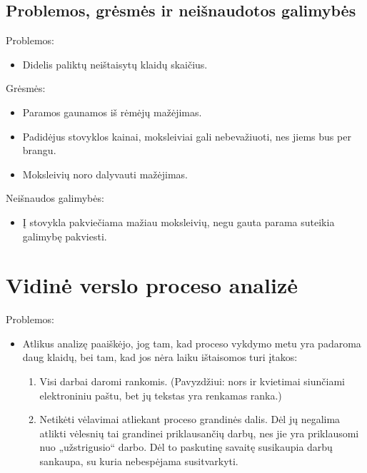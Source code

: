\subsection{Problemos, grėsmės ir neišnaudotos galimybės}

Problemos:
\begin{itemize}
  \item Didelis paliktų neištaisytų klaidų skaičius.
\end{itemize}

Grėsmės:
\begin{itemize}
  \item Paramos gaunamos iš rėmėjų mažėjimas. 
  \item Padidėjus stovyklos kainai, moksleiviai gali nebevažiuoti, nes 
    jiems bus per brangu.
  \item Moksleivių noro dalyvauti mažėjimas.
\end{itemize}

Neišnaudos galimybės:
\begin{itemize}
  \item Į stovykla pakviečiama mažiau moksleivių, negu gauta parama
    suteikia galimybę pakviesti.        %
\end{itemize}

\section{Vidinė verslo proceso analizė}

Problemos:
\begin{itemize}
  \item Atlikus analizę paaiškėjo, jog tam, kad proceso vykdymo metu yra
    padaroma daug klaidų, bei tam, kad jos nėra laiku ištaisomos turi
    įtakos:
    \begin{enumerate}
      \item Visi darbai daromi rankomis. (Pavyzdžiui: nors ir kvietimai
        siunčiami elektroniniu paštu, bet jų tekstas yra renkamas ranka.)
      \item Netikėti vėlavimai atliekant proceso grandinės dalis. Dėl jų 
        negalima atlikti vėlesnių tai grandinei priklausančių darbų, nes
        jie yra priklausomi nuo „užstrigusio“ darbo. Dėl to paskutinę 
        savaitę susikaupia
        darbų sankaupa, su kuria nebespėjama susitvarkyti.
    \end{enumerate}
\end{itemize}

